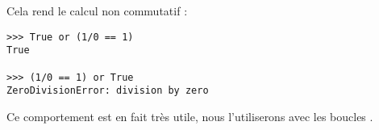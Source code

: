 Cela rend le calcul non commutatif :
\begin{lstlisting}
>>> True or (1/0 == 1)
True

>>> (1/0 == 1) or True
ZeroDivisionError: division by zero
\end{lstlisting}
Ce comportement est en fait très utile, nous l'utiliserons avec les boucles .
